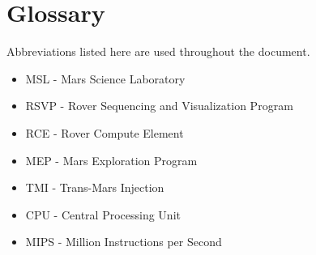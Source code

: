 \chapter*{Glossary}

Abbreviations listed here are used throughout the document.

\begin{itemize}
\item MSL - Mars Science Laboratory
\item RSVP - Rover Sequencing and Visualization Program
\item RCE - Rover Compute Element
\item MEP - Mars Exploration Program
\item TMI - Trans-Mars Injection
\item CPU - Central Processing Unit
\item MIPS - Million Instructions per Second
\end{itemize}